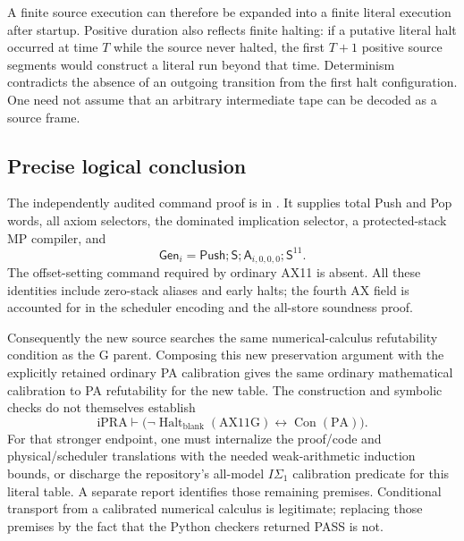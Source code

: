 A finite source execution can therefore be expanded into a finite literal
execution after startup. Positive duration also reflects finite halting:
if a putative literal halt occurred at time $T$ while the source never
halted, the first $T+1$ positive source segments would construct a literal
run beyond that time. Determinism contradicts the absence of an outgoing
transition from the first halt configuration. One need not assume that an
arbitrary intermediate tape can be decoded as a source frame.

\subsection{Precise logical conclusion}

The independently audited command proof is in .
It supplies total Push and Pop words, all axiom selectors, the dominated
implication selector, a protected-stack MP compiler, and
\[
 \mathsf{Gen}_i=\mathsf{Push};\mathsf S;
     \mathsf A_{i,0,0,0};\mathsf S^{11}.
\]
The offset-setting command required by ordinary AX11 is absent. All these
identities include zero-stack aliases and early halts; the fourth AX field
is accounted for in the scheduler encoding and the all-store soundness proof.

Consequently the new source searches the same numerical-calculus
refutability condition as the G parent. Composing this new preservation
argument with the explicitly retained ordinary PA calibration gives the
same ordinary mathematical calibration to PA refutability for the new table.
The construction and symbolic checks do not themselves establish
\[
 \mathrm{iPRA}\vdash
 \bigl(\neg\operatorname{Halt}_{\mathrm{blank}}(\mathrm{AX11G})
          \leftrightarrow\operatorname{Con}(\mathrm{PA})\bigr).
\]
For that stronger endpoint, one must internalize the proof/code and
physical/scheduler translations with the needed weak-arithmetic induction
bounds, or discharge the repository's all-model $I\Sigma_1$ calibration
predicate for this literal table. A separate report identifies those
remaining premises. Conditional transport from a calibrated numerical
calculus is legitimate; replacing those premises by the fact that the
Python checkers returned PASS is not.
